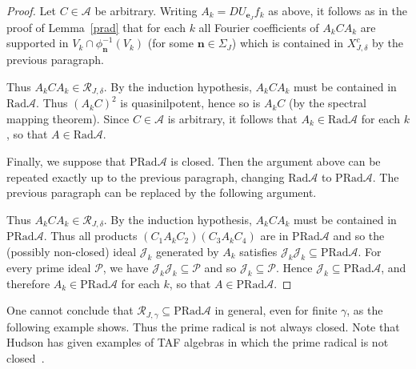 \documentclass[12pt]{amsart}
\theoremstyle{definition}
\newcommand{\mcA}{\mathcal{A}}
\newcommand{\mcR}{\mathcal{R}}
\newcommand{\rad}{\mathrm{Rad}}
\newcommand{\prad}{\mathrm{PRad}}
\newcommand{\bo}[1]{\mathbf{#1}}
\newcommand{\bon}{\mathbf{n}}
\begin{document}
\begin{proof}
Let $C\in \mcA$ be arbitrary. Writing $A_k=D U_{\bo{e}_J} f_k$
as above, it follows as in the proof of Lemma~\ref{prad}
that for each $k$ all Fourier coefficients of $A_kCA_k$ are supported
in $V_k\cap \phi _{\bon}^{-1}(V_k)$ (for some $\bon \in\Sigma_J$)
which is contained in $X_{J,\delta }^{c}$ by the
previous paragraph.
\begin{comment}
\footnote{(Delete before submitting) Indeed,
\[
A_{k}CA_{k}=DU_{\mathbf{e}_{J}}f_{k}CDU_{\mathbf{e}_{J}}f_{k}
\]
so, if $E_{\mathbf{m}}(CD)=g$, we have
\begin{eqnarray*}
&&DU_{\mathbf{e}_{J}}f_{k}U_{\mathbf{m}}E_{\mathbf{m}}(CD)U_{\mathbf{e}%
_{J}}f_{k}=DU_{\mathbf{e}_{J}}f_{k}U_{\mathbf{m}}gU_{\mathbf{e}_{J}}f_{k} \\
&=&DU_{\mathbf{e}_{J}}f_{k}U_{\mathbf{m+e}_{J}}\alpha _{\mathbf{e}%
_{J}}(g)f_{k}=DU_{\mathbf{m+}2\mathbf{e}_{J}}\alpha _{\mathbf{m+e}%
_{J}}(f_{k})\alpha _{\mathbf{e}_{J}}(g)f_{k}
\end{eqnarray*}
and the function
$\alpha _{\bo{m+e}_{J}}(f_k)\alpha _{\bo{e}_J}(g)f_k$ has compact support
in $V_k\cap \phi _{\bo{m+e}_J}^{-1}(V_k)$.}
\end{comment}

Thus $A_{k}CA_{k}\in \mcR_{J,\delta}$.
By the induction hypothesis, $A_{k}CA_{k}$ must be contained in
$\rad\mcA$.
Thus $(A_{k}C)^2$ is quasinilpotent, hence so is
$A_{k}C$ (by the spectral mapping theorem). Since $C \in \mcA$ is
arbitrary, it follows that  $A_k \in \rad\mcA$ for each $k$, so
that $A\in \rad\mcA$.

Finally, we suppose that $\prad\mcA$ is closed.
Then the argument above can be repeated exactly up to the
previous paragraph, changing $\rad\mcA$ to $\prad\mcA$.
The previous paragraph can be replaced by the following
argument.

Thus $A_{k}CA_{k}\in \mathcal{R}_{J,\delta }$.
By the induction hypothesis, $A_{k}CA_{k}$ must be contained in
$\prad\mcA$. Thus all products $(C_1 A_{k}C_2)(C_3A_{k}C_{4})$ are
in $\prad\mcA$ and so the (possibly non-closed) ideal
$\mathcal{J}_{k}$ generated by $A_{k}$ satisfies
$\mathcal{J}_{k}\mathcal{J}_{k}\subseteq\prad\mcA$.
For every prime ideal $\mathcal{P}$, we have
$\mathcal{J}_{k}\mathcal{J}_{k}\subseteq \mathcal{P}$
and so $\mathcal{J}_{k}\subseteq \mathcal{P}$.
Hence $\mathcal{J}_{k}\subseteq \prad\mcA$, and therefore
$A_{k}\in \prad\mcA$ for each $k$, so that $A\in \prad\mcA$.
\end{proof}

One cannot conclude that $\mcR_{J,\gamma}\subseteq\prad\mcA$ in general,
even for finite $\gamma$, as the following example shows.
Thus the prime radical is not always closed.
Note that Hudson has given examples of TAF algebras in which
the prime radical is not closed~\cite[Example~4.9]{Hud97}.
\end{document}
